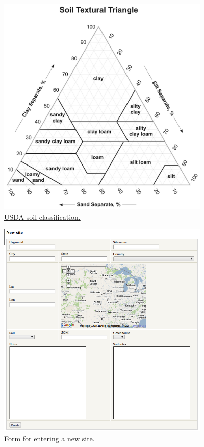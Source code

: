 \documentclass[12pt,english,portrait]{article}
\begin{document}
\begin{figure}
  \includegraphics[width=4in]{figures/soiltexture.png} 
  \caption{\href{http://soils.usda.gov/education/resources/lessons/texture/}{USDA soil classification.} }
  \label{fig:soiltexture}
\end{figure}


\begin{figure}
  \includegraphics[width=4in]{figures/sites_new.png} 
  \caption{\href{http://ebi-forecast.igb.uiuc.edu/bety/sites/new}{Form for entering a new site.} }
  \label{fig:sites_new}
\end{figure}
\end{document}
